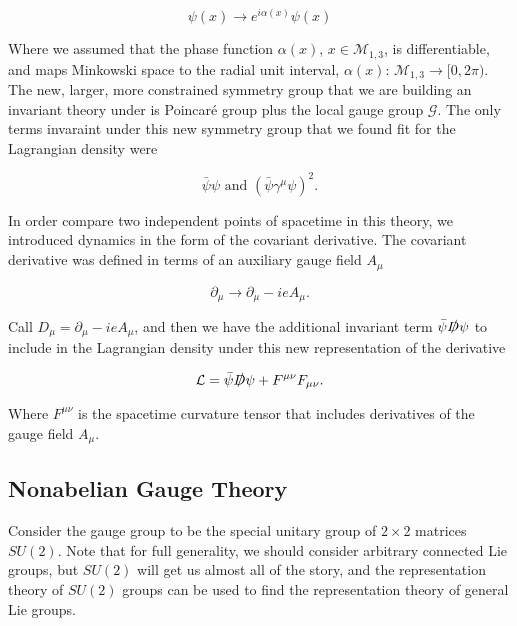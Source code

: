 \documentclass[10pt]{article}
\begin{document}
\begin{equation}
\psi (x) \rightarrow e^{i \alpha (x)} \psi (x)
\end{equation}

\noindent Where we assumed that the phase function $\alpha (x)$, $x \in \mathcal{M}_{1,3}$, is differentiable, and maps Minkowski space to the radial unit interval, $\alpha (x): \, \mathcal{M}_{1,3} \rightarrow [0, 2 \pi )$. \\

\noindent The new, larger, more constrained symmetry group that we are building an invariant theory under is Poincar\'e group plus the local gauge group $\mathcal{G}$. The only terms invaraint under this new symmetry group that we found fit for the Lagrangian density were

\begin{equation}
\bar{\psi} \psi \text{ and } (\bar{\psi} \gamma^\mu \psi )^2.
\end{equation}

\noindent In order compare two independent points of spacetime in this theory, we introduced dynamics in the form of the covariant derivative. The covariant derivative was defined in terms of an auxiliary gauge field $A_\mu$

\begin{equation}
\partial_\mu \rightarrow \partial_\mu - i e A_\mu.
\end{equation}

\noindent Call $D_\mu = \partial_\mu - i e A_\mu$, and then we have the additional invariant term $\bar{\psi} \slashed{D} \psi$ to include in the Lagrangian density under this new representation of the derivative 

\begin{equation}
\mathcal{L} = \bar{\psi} \slashed{D} \psi + F^{\mu\nu} F_{\mu\nu}.
\end{equation}

\noindent Where $F^{\mu\nu}$ is the spacetime curvature tensor that includes derivatives of the gauge field $A_\mu$. \\

\subsection*{Nonabelian Gauge Theory}

\noindent Consider the gauge group to be the special unitary group of $2 \times 2$ matrices $SU(2)$. Note that for full generality, we should consider arbitrary connected Lie groups, but $SU(2)$ will get us almost all of the story, and the representation theory of $SU(2)$ groups can be used to find the representation theory of general Lie groups. \\
\end{document}
